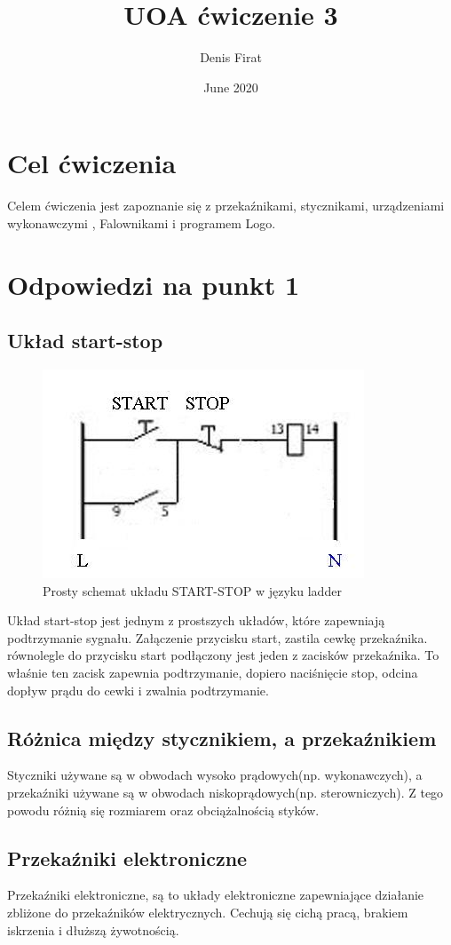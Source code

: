 \documentclass{article}
\title{UOA ćwiczenie 3}
\author{Denis Firat}
\date{June 2020}
\begin{document}
\maketitle

\section{Cel ćwiczenia}
Celem ćwiczenia jest zapoznanie się z przekaźnikami, stycznikami, urządzeniami wykonawczymi , Falownikami i programem Logo.

\section{Odpowiedzi na punkt 1}
\subsection{Układ start-stop}
\begin{figure}[!ht]
    \centering
    \includegraphics[scale=0.8]{startstop.jpg}
    \caption{Prosty schemat układu START-STOP w języku ladder}
\end{figure}
Układ start-stop jest jednym z prostszych układów, które zapewniają
podtrzymanie sygnału. Załączenie przycisku start, zastila cewkę przekaźnika.
równolegle do przycisku start podłączony jest jeden z zacisków przekaźnika. To
właśnie ten zacisk zapewnia podtrzymanie, dopiero naciśnięcie stop, odcina dopływ prądu do
cewki i zwalnia podtrzymanie.
\subsection{Różnica między stycznikiem, a przekaźnikiem}
Styczniki używane są w obwodach wysoko prądowych(np. wykonawczych), a przekaźniki
używane są w obwodach niskoprądowych(np. sterowniczych). Z tego powodu różnią się rozmiarem oraz
obciążalnością styków.
\subsection{Przekaźniki elektroniczne}
Przekaźniki elektroniczne, są to układy elektroniczne zapewniające działanie
zbliżone do przekaźników elektrycznych. Cechują się cichą pracą, brakiem iskrzenia i dłuższą żywotnością.
\end{document}
